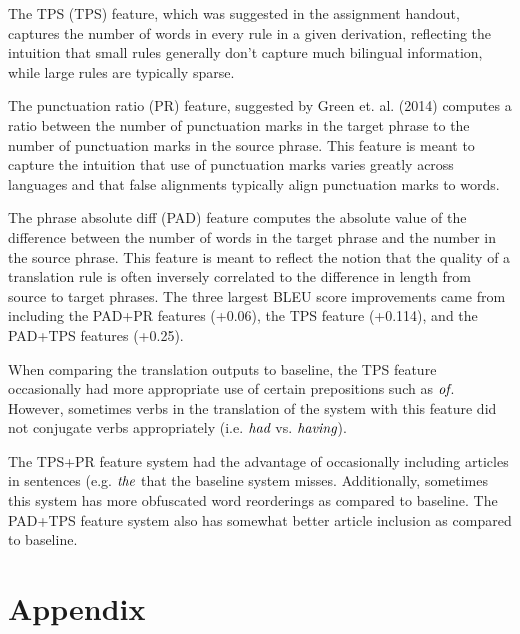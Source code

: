 \documentclass[12pt]{article}
\begin{document}
\begin{multicols}{2}
The TPS (TPS) feature, which was suggested in the assignment handout, captures the number of words in every rule in a given derivation, reflecting the intuition that small rules generally don't capture much bilingual information, while large rules are typically sparse.

The punctuation ratio (PR) feature, suggested by Green et. al. (2014) computes a ratio between the number of punctuation marks in the target phrase to the number of punctuation marks in the source phrase. This feature is meant to capture the intuition that use of punctuation marks varies greatly across languages and that false alignments typically align punctuation marks to words.

The phrase absolute diff (PAD) feature computes the absolute value of the difference between the number of words in the target phrase and the number in the source phrase. This feature is meant to reflect the notion that the quality of a translation rule is often inversely correlated to the difference in length from source to target phrases. The three largest BLEU score improvements came from including the PAD+PR features (+0.06), the TPS feature (+0.114), and the PAD+TPS features (+0.25).

When comparing the translation outputs to baseline, the TPS feature occasionally had more appropriate use of certain prepositions such as $\emph{of}$. However, sometimes verbs in the translation of the system with this feature did not conjugate verbs appropriately (i.e. $\emph{had}$ vs. $\emph{having}$).

The TPS+PR feature system had the advantage of occasionally including articles in sentences (e.g. $\emph{the}$ that the baseline system misses. Additionally, sometimes this system has more obfuscated word reorderings as compared to baseline. The PAD+TPS feature system also has somewhat better article inclusion as compared to baseline.


\end{multicols}





\pagebreak

\section{Appendix}
\end{document}
